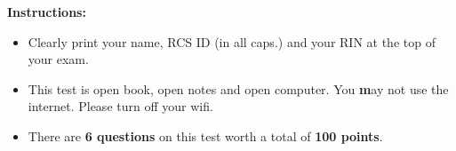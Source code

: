 \documentclass[10pt]{article}
\begin{document}
\vspace*{.45in} 

{\large\bf Instructions:}
\begin{itemize}
\item Clearly print your name, RCS ID (in all caps.) and your RIN at the top of your exam.
\item This test is open book, open notes and open computer. You {\textbf may not} use the internet. Please turn off your wifi.
\item There are \textbf{6 questions} on this test worth a total of
  \textbf{100 points}.
\end{itemize}


\newpage


\fi
\end{document}
